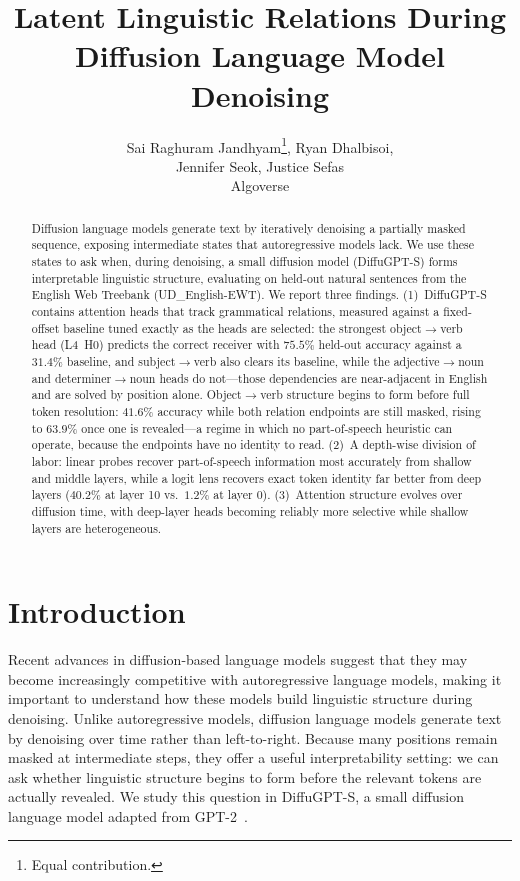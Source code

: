 \documentclass{article} %
\title{Latent Linguistic Relations During Diffusion Language Model Denoising}
\author{
Sai Raghuram Jandhyam\thanks{Equal contribution.}, Ryan Dhalbisoi\footnotemark[1], \\
Jennifer Seok, Justice Sefas \\
Algoverse
}
\begin{document}
\maketitle
 
\begin{abstract}
Diffusion language models generate text by iteratively denoising a partially masked sequence, exposing intermediate states that autoregressive models lack. We use these states to ask when, during denoising, a small diffusion model (DiffuGPT-S) forms interpretable linguistic structure, evaluating on held-out natural sentences from the English Web Treebank (UD\_English-EWT). We report three findings. (1)~DiffuGPT-S contains attention heads that track grammatical relations, measured against a fixed-offset baseline tuned exactly as the heads are selected: the strongest object$\to$verb head (L4~H0) predicts the correct receiver with $75.5\%$ held-out accuracy against a $31.4\%$ baseline, and subject$\to$verb also clears its baseline, while the adjective$\to$noun and determiner$\to$noun heads do not---those dependencies are near-adjacent in English and are solved by position alone. Object$\to$verb structure begins to form before full token resolution: $41.6\%$ accuracy while both relation endpoints are still masked, rising to $63.9\%$ once one is revealed---a regime in which no part-of-speech heuristic can operate, because the endpoints have no identity to read. (2)~A depth-wise division of labor: linear probes recover part-of-speech information most accurately from shallow and middle layers, while a logit lens recovers exact token identity far better from deep layers ($40.2\%$ at layer 10 vs.\ $1.2\%$ at layer 0). (3)~Attention structure evolves over diffusion time, with deep-layer heads becoming reliably more selective while shallow layers are heterogeneous.

\end{abstract}

\section{Introduction}

Recent advances in diffusion-based language models 
suggest that they may become increasingly competitive with autoregressive language models, making it important to understand how these models build linguistic structure during denoising. Unlike autoregressive models, diffusion language models generate text by denoising over time rather than left-to-right. Because many positions remain masked at intermediate steps, they offer a useful interpretability setting: we can ask whether linguistic structure begins to form before the relevant tokens are actually revealed. We study this question in DiffuGPT-S, a small diffusion language model adapted from GPT-2~\citep{gong2025scaling}.
\end{document}
